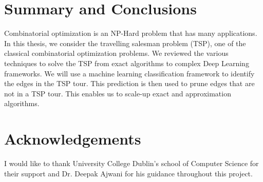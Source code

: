 \documentclass[]{UCD_CS_FYP_Report}
\begin{document}
\chapter{Summary and Conclusions}
Combinatorial optimization is an NP-Hard problem that has many applications. In this thesis, we consider the travelling salesman problem (TSP), one of the classical combinatorial optimization problems. We reviewed the various techniques to solve the TSP from exact algorithms to complex Deep Learning frameworks. We will use a machine learning classification framework to identify the edges in the TSP tour. This prediction is then used to prune edges that are not in a TSP tour. This enables us to scale-up exact and approximation algorithms. 



%


\chapter*{Acknowledgements}
I would like to thank University College Dublin’s school of Computer Science for their support and Dr. Deepak Ajwani for his guidance throughout this project.


\printbibliography


\end{document}
